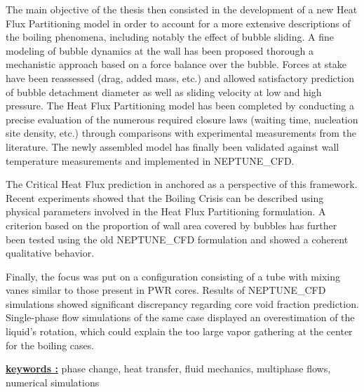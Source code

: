 \npar

The main objective of the thesis then consisted in the development of a new Heat Flux Partitioning model in order to account for a more extensive descriptions of the boiling phenomena, including notably the effect of bubble sliding. A fine modeling of bubble dynamics at the wall has been proposed thorough a mechanistic approach based on a force balance over the bubble. Forces at stake have been reassessed (drag, added mass, etc.) and allowed satisfactory prediction of bubble detachment diameter as well as sliding velocity at low and high pressure. The Heat Flux Partitioning model has been completed by conducting a precise evaluation of the numerous required closure laws (waiting time, nucleation site density, etc.) through comparisons with experimental measurements from the literature. The newly assembled model has finally been validated against wall temperature measurements and implemented in NEPTUNE\_CFD.

\npar

The Critical Heat Flux prediction in anchored as a perspective of this framework. Recent experiments showed that the Boiling Crisis can be described using physical parameters involved in the Heat Flux Partitioning formulation. A criterion based on the proportion of wall area covered by bubbles has further been tested using the old NEPTUNE\_CFD formulation and showed a coherent qualitative behavior.

\npar

Finally, the focus was put on a configuration consisting of a tube with mixing vanes similar to those present in PWR cores. Results of NEPTUNE\_CFD simulations showed significant discrepancy regarding core void fraction prediction. Single-phase flow simulations of the same case displayed an overestimation of the liquid’s rotation, which could explain the too large vapor gathering at the center for the boiling cases. 

\endgroup		

\npar

\npar

\textbf{\underline{keywords :}} phase change, heat transfer, fluid mechanics, multiphase flows, numerical simulations

\vfill